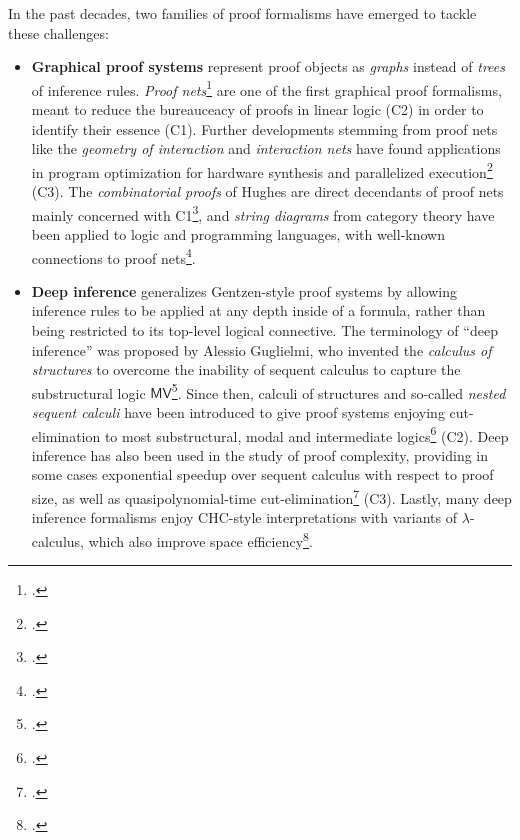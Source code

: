 \documentclass[12pt,draftproposal]{msca-pf}
\begin{document}
In the past decades, two families of proof formalisms have emerged to tackle these challenges:
\begin{itemize}
    \item \textbf{Graphical proof systems} represent proof objects as \emph{graphs} instead of
    \emph{trees} of inference rules.
    \emph{Proof nets}\footcite{girard-linear-1987} are one of the first graphical proof formalisms,
    meant to reduce the bureauceacy of proofs in linear logic (C2) in order to identify their
    essence (C1). Further developments stemming from proof nets like the \emph{geometry of
    interaction} and \emph{interaction nets} have found applications in program optimization for
    hardware synthesis and parallelized
    execution\footcite{ghicaGeometrySynthesisStructured2007,mackieInteractionNetImplementation2011}
    (C3). The \emph{combinatorial proofs} of Hughes are direct decendants of proof nets mainly
    concerned with C1\footcite{Hughes_2006}, and \emph{string diagrams} from category theory have
    been applied to logic and programming languages, with well-known connections to proof
    nets\footcite{piedeleuIntroductionStringDiagrams2025}.

    \item \textbf{Deep inference} generalizes Gentzen-style proof systems by allowing inference
    rules to be applied at any depth inside of a formula, rather than being restricted to its
    top-level logical connective. The terminology of ``deep inference'' was proposed by Alessio
    Guglielmi, who invented the \emph{calculus of structures} to overcome the inability of sequent
    calculus to capture the substructural logic $\mathsf{MV}$\footcite{Guglielmi1999ACO}. Since
    then, calculi of structures and so-called \emph{nested sequent calculi} have been introduced to
    give proof systems enjoying cut-elimination to most substructural, modal and intermediate
    logics\footcite{kuznets_maehara-style_2019,postniece_proof_2010} (C2). Deep inference has also
    been used in the study of proof complexity, providing in some cases exponential speedup over
    sequent calculus with respect to proof size, as well as quasipolynomial-time
    cut-elimination\footcite{dasRelativeProofComplexity2015a,bruscoliQuasipolynomialNormalisationDeep2016a}
    (C3). Lastly, many deep inference formalisms enjoy CHC-style interpretations with variants of
    $\lambda$-calculus, which also improve space
    efficiency\footcite{guenot_nested_2013,gundersenAtomicLambdaCalculus2013}.
\end{itemize}
\end{document}
